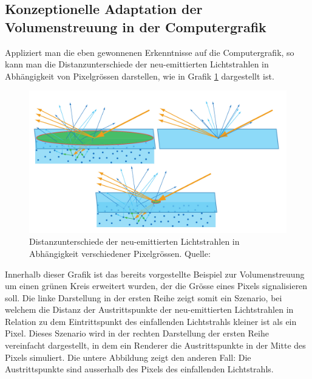 \documentclass[ngerman,runningheads,a4paper]{llncs}[2018/03/10]
\begin{document}
\subsection{Konzeptionelle Adaptation der Volumenstreuung in der Computergrafik}

Appliziert man die eben gewonnenen Erkenntnisse auf die Computergrafik, so kann man die Distanzunterschiede der neu-emittierten Lichtstrahlen in Abhängigkeit von Pixelgrössen darstellen, wie in Grafik \ref{fig:subsurface-scattering-pixel-considerations} dargestellt ist.

\begin{figure}
  \centering
  \includegraphics[scale=0.2,keepaspectratio]{./images/subsurface-scattering-pixel-considerations.jpg}
  \caption{Distanzunterschiede der neu-emittierten Lichtstrahlen in Abhängigkeit verschiedener Pixelgrössen. Quelle: \cite{real-time-rendering}}
  \label{fig:subsurface-scattering-pixel-considerations}
\end{figure}

Innerhalb dieser Grafik ist das bereits vorgestellte Beispiel zur Volumenstreuung um einen grünen Kreis erweitert wurden, der die Grösse eines Pixels signalisieren soll.
Die linke Darstellung in der ersten Reihe zeigt somit ein Szenario, bei welchem die Distanz der Austrittspunkte der neu-emittierten Lichtstrahlen in Relation zu dem Eintrittspunkt des einfallenden Lichtstrahls kleiner ist als ein Pixel.
Dieses Szenario wird in der rechten Darstellung der ersten Reihe  vereinfacht dargestellt, in dem ein Renderer die Austrittspunkte in der Mitte des Pixels simuliert.
Die untere Abbildung zeigt den anderen Fall: Die Austrittspunkte sind ausserhalb des Pixels des einfallenden Lichtstrahls.
\end{document}
